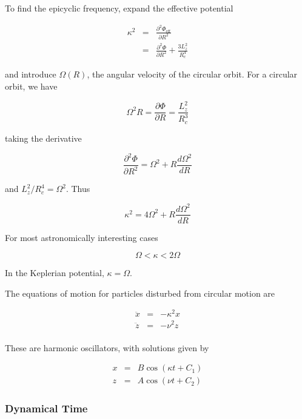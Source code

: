 To find the epicyclic frequency, expand the effective potential 

\begin{eqnarray}
\kappa^2 &=& \frac{\partial^2 \varPhi_\mathrm{eff}}{\partial R^2}\\
&=& \frac{\partial^2 \varPhi}{\partial R^2} + \frac{3L_z^2}{R_c^4}
\end{eqnarray}

and introduce $\Omega(R)$, the angular velocity of the circular orbit. For a circular orbit, we have 


\begin{equation}
\Omega^2 R = \frac{\partial \varPhi}{\partial R} = \frac{L_z^2}{R_c^3} 
\end{equation}

taking the derivative 

\begin{equation}
\frac{\partial^2 \varPhi}{\partial R^2} = \Omega^2 + R\frac{d\Omega^2}{d R} 
\end{equation}

and $L_z^2/R_c^4 = \Omega^2$. Thus 


\begin{equation}
\kappa^2 = 4\Omega^2 + R\frac{d\Omega^2}{d R} 
\end{equation}

For most astronomically interesting cases 

\begin{equation}
\Omega < \kappa < 2\Omega
\end{equation}

In the Keplerian potential, $\kappa=\Omega$. 

The equations of motion for particles disturbed from circular motion are


\begin{eqnarray}
\ddot{x} &=& -\kappa^2 x \\
\ddot{z} &=& -\nu^2 z \\
\end{eqnarray}


These are harmonic oscillators, with solutions given by

\begin{eqnarray}
x &=& B\cos(\kappa t + C_1) \\
z &=& A\cos(\nu t + C_2) 
\end{eqnarray}

\subsubsection{Dynamical Time}

